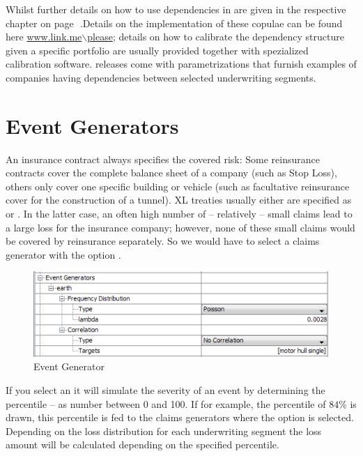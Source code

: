 Whilst further details on how to use dependencies in \RA are given in the respective chapter on page~\pageref{chap:dependencies}\,\ff{}.Details on the implementation of these copulae can be found here \href{www.link.me$\backslash$please}{www.link.me$\backslash$please}; details on how to calibrate the dependency structure given a specific portfolio are usually provided together with spezialized calibration software. \PO{} \RA{} releases come with parametrizations that furnish examples of companies having dependencies between selected underwriting segments.

\section{Event Generators}
\label{sec:eventgenerator}

An insurance contract always specifies the covered risk: Some reinsurance contracts cover the complete balance sheet of a company (such as Stop Loss), others only cover one specific building or vehicle (such as facultative reinsurance cover for the construction of a tunnel). XL treaties usually either are specified as  or . In the latter case, an often high number of -- relatively -- small claims lead to a large loss for the insurance company; however, none of these small claims would be covered by reinsurance separately. So we would have to select a claims generator with the option .

\begin{figure}[htb]
	\centering
		\includegraphics[scale=0.6]{images/EventGenerator.png}
	\caption{Event Generator}
	\label{fig:EventGenerator}
\end{figure}

If you select an  it will simulate the severity of an event by determining the percentile -- as number between 0 and 100. If for example, the percentile of $84\%$ is drawn, this percentile is fed to the claims generators where the option  is selected. Depending on the loss distribution for each underwriting segment the loss amount will be calculated depending on the specified percentile.

